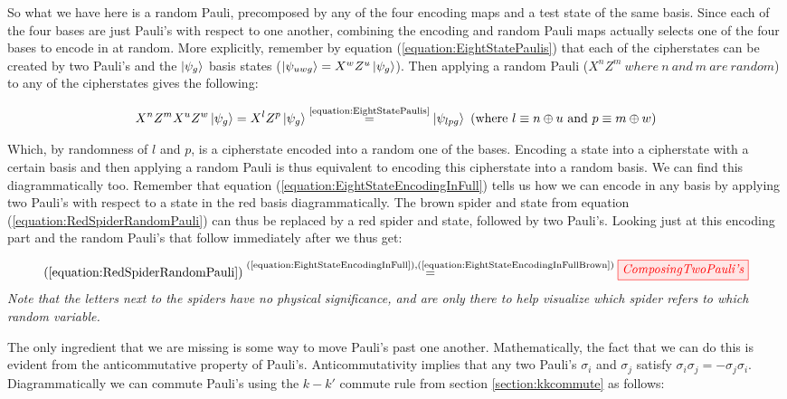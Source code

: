 \documentclass[]{article}
\newcommand{\equaltext}[1]{\ensuremath{\stackrel{\text{#1}}{=}}}
\begin{document}
So what we have here is a random Pauli, precomposed by any of the four encoding maps and a test state of the same basis. Since each of the four bases are just Pauli's with respect to one another, combining the encoding and random Pauli maps actually selects one of the four bases to encode in at random. More explicitly, remember by equation (\ref{equation:EightStatePaulis}) that each of the cipherstates can be created by two Pauli's and the $\ket{\psi_g}$ basis states ($\ket{\psi_{uwg}} = X^w Z^u\ket{\psi_{g}}$). Then applying a random Pauli ($X^n Z^m~where~n~and~m~are~random$) to any of the cipherstates gives the following:

\begin{equation}
\label{equation:EncodingInRandomCipherstate}
X^nZ^mX^uZ^w\ket{\psi_{g}} = X^lZ^p\ket{\psi_{g}} \equaltext{\ref{equation:EightStatePaulis}} \ket{\psi_{lpg}} ~(\text{where}~ l \equiv n \oplus u ~\text{and}~ p \equiv m \oplus w)
\end{equation}

Which, by randomness of $l$ and $p$, is a cipherstate encoded into a random one of the bases. Encoding a state into a cipherstate with a certain basis and then applying a random Pauli is thus equivalent to encoding this cipherstate into a random basis. We can find this diagrammatically too. Remember that equation (\ref{equation:EightStateEncodingInFull}) tells us how we can encode in any basis by applying two Pauli's with respect to a state in the red basis diagrammatically. The brown spider and state from equation (\ref{equation:RedSpiderRandomPauli}) can thus be replaced by a red spider and state, followed by two Pauli's. Looking just at this encoding part and the random Pauli's that follow immediately after we thus get:

\begin{equation}
	\label{equation:composingtwopaulis} (\ref{equation:RedSpiderRandomPauli}) \equaltext{(\ref{equation:EightStateEncodingInFull}),(\ref{equation:EightStateEncodingInFullBrown})}
 \tikzfig{ComposingTwoPauli's}
\end{equation}
\textit{Note that the letters next to the spiders have no physical significance, and are only there to help visualize which spider refers to which random variable.}

The only ingredient that we are missing is some way to move Pauli's past one another. Mathematically, the fact that we can do this is evident from the anticommutative property of Pauli's. Anticommutativity implies that any two Pauli's $\sigma_i$ and $\sigma_j$ satisfy $\sigma_i\sigma_j = - \sigma_j\sigma_i$. Diagrammatically we can commute Pauli's using the $k-k'$ commute rule from section \ref{section:kkcommute} as follows:
\end{document}
